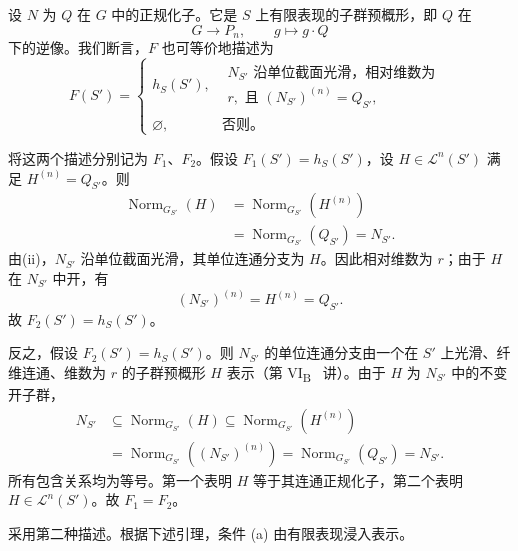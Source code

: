 设 \(N\) 为 \(Q\) 在 \(G\) 中的正规化子。它是 \(S\) 上有限表现的子群预概形，即 \(Q\) 在
\[
  G\longrightarrow P_n,\qquad g\longmapsto g\cdot Q
\]
下的逆像。我们断言，\(F\) 也可等价地描述为
\[
F(S')=
\begin{cases}
h_S(S'),&
\begin{array}{l}
N_{S'}\text{ 沿单位截面光滑，相对维数为 }\\
r,\text{ 且 }(N_{S'})^{(n)}=Q_{S'},
\end{array}\\[2mm]
\varnothing,&\text{否则。}
\end{cases}
\]

将这两个描述分别记为 \(F_1\)、\(F_2\)。假设 \(F_1(S')=h_S(S')\)，设 \(H\in\mathcal L^n(S')\) 满足 \(H^{(n)}=Q_{S'}\)。则
\[
\begin{aligned}
\operatorname{Norm}_{G_{S'}}(H)
 &=\operatorname{Norm}_{G_{S'}}(H^{(n)})\\
 &=\operatorname{Norm}_{G_{S'}}(Q_{S'})
 =N_{S'}.
\end{aligned}
\]
由(ii)，\(N_{S'}\) 沿单位截面光滑，其单位连通分支为 \(H\)。因此相对维数为 \(r\)；由于 \(H\) 在 \(N_{S'}\) 中开，有
\[
  (N_{S'})^{(n)}=H^{(n)}=Q_{S'}.
\]
故 \(F_2(S')=h_S(S')\)。

反之，假设 \(F_2(S')=h_S(S')\)。则 \(N_{S'}\) 的单位连通分支由一个在 \(S'\) 上光滑、纤维连通、维数为 \(r\) 的子群预概形 \(H\) 表示（第 VI\textsubscript{B}~ 讲）。由于 \(H\) 为 \(N_{S'}\) 中的不变开子群，
\[
\begin{aligned}
N_{S'}&\subseteq\operatorname{Norm}_{G_{S'}}(H)
\subseteq\operatorname{Norm}_{G_{S'}}(H^{(n)})\\
&=\operatorname{Norm}_{G_{S'}}((N_{S'})^{(n)})
=\operatorname{Norm}_{G_{S'}}(Q_{S'})=N_{S'}.
\end{aligned}
\]
所有包含关系均为等号。第一个表明 \(H\) 等于其连通正规化子，第二个表明 \(H\in\mathcal L^n(S')\)。故 \(F_1=F_2\)。

采用第二种描述。根据下述引理，条件 (a) 由有限表现浸入表示。


